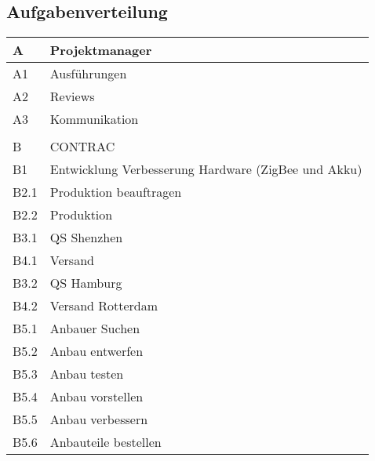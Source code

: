 \subsection{Aufgabenverteilung}
\begin{table}[H]
    \renewcommand{\arraystretch}{1.1}
    \begin{center}
        \begin{tabular}{l|l}
            \hline
            A    & Projektmanager                                      \\ \hline
            A1   & Ausführungen                                        \\ \hline
            A2   & Reviews                                             \\ \hline
                        A3 & Kommunikation \\\hline
            &                                                     \\ \hline
            B    & CONTRAC                                             \\ \hline
            B1   & Entwicklung Verbesserung Hardware (ZigBee und Akku) \\ \hline
            B2.1 & Produktion beauftragen                              \\ \hline
            B2.2 & Produktion                                          \\ \hline
            B3.1 & QS Shenzhen                                         \\ \hline
            B4.1 & Versand                                             \\ \hline
            B3.2 & QS Hamburg                                          \\ \hline
            B4.2 & Versand Rotterdam                                   \\ \hline
            B5.1 & Anbauer Suchen                                      \\ \hline
            B5.2 & Anbau entwerfen                                     \\ \hline
            B5.3 & Anbau testen                                        \\ \hline
            B5.4 & Anbau vorstellen                                    \\ \hline
            B5.5 & Anbau verbessern                                    \\ \hline
            B5.6 & Anbauteile bestellen                                \\ \hline

\end{tabular}
\end{center}
\end{table}
